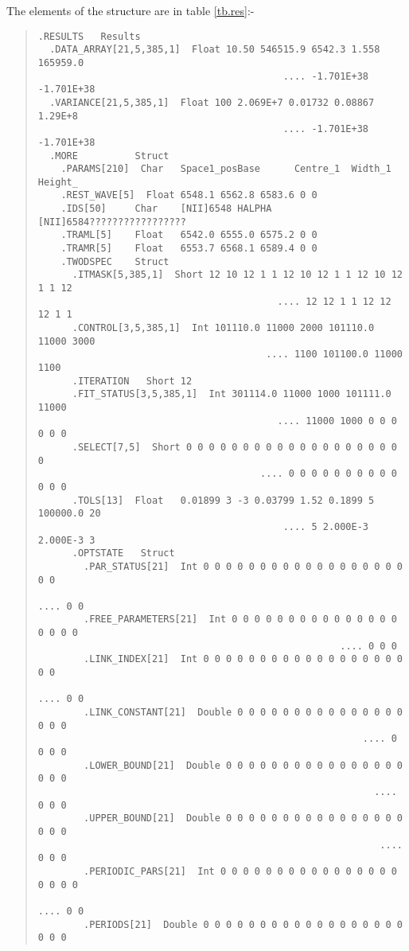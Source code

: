  The elements of the structure are in table \ref{tb.res}:-
\begin{table}
\begin{quote}\begin{verbatim}
.RESULTS   Results
  .DATA_ARRAY[21,5,385,1]  Float 10.50 546515.9 6542.3 1.558 165959.0
                                           .... -1.701E+38 -1.701E+38
  .VARIANCE[21,5,385,1]  Float 100 2.069E+7 0.01732 0.08867 1.29E+8
                                           .... -1.701E+38 -1.701E+38
  .MORE          Struct
    .PARAMS[210]  Char   Space1_posBase      Centre_1  Width_1   Height_
    .REST_WAVE[5]  Float 6548.1 6562.8 6583.6 0 0
    .IDS[50]     Char    [NII]6548 HALPHA    [NII]6584?????????????????
    .TRAML[5]    Float   6542.0 6555.0 6575.2 0 0
    .TRAMR[5]    Float   6553.7 6568.1 6589.4 0 0
    .TWODSPEC    Struct
      .ITMASK[5,385,1]  Short 12 10 12 1 1 12 10 12 1 1 12 10 12 1 1 12
                                          .... 12 12 1 1 12 12 12 1 1
      .CONTROL[3,5,385,1]  Int 101110.0 11000 2000 101110.0 11000 3000
                                        .... 1100 101100.0 11000 1100
      .ITERATION   Short 12
      .FIT_STATUS[3,5,385,1]  Int 301114.0 11000 1000 101111.0 11000
                                          .... 11000 1000 0 0 0 0 0 0
      .SELECT[7,5]  Short 0 0 0 0 0 0 0 0 0 0 0 0 0 0 0 0 0 0 0 0
                                       .... 0 0 0 0 0 0 0 0 0 0 0 0 0
      .TOLS[13]  Float   0.01899 3 -3 0.03799 1.52 0.1899 5 100000.0 20
                                           .... 5 2.000E-3 2.000E-3 3
      .OPTSTATE   Struct
        .PAR_STATUS[21]  Int 0 0 0 0 0 0 0 0 0 0 0 0 0 0 0 0 0 0 0 0
                                                             .... 0 0
        .FREE_PARAMETERS[21]  Int 0 0 0 0 0 0 0 0 0 0 0 0 0 0 0 0 0 0 0
                                                     .... 0 0 0
        .LINK_INDEX[21]  Int 0 0 0 0 0 0 0 0 0 0 0 0 0 0 0 0 0 0 0 0
                                                             .... 0 0
        .LINK_CONSTANT[21]  Double 0 0 0 0 0 0 0 0 0 0 0 0 0 0 0 0 0 0
                                                         .... 0 0 0 0
        .LOWER_BOUND[21]  Double 0 0 0 0 0 0 0 0 0 0 0 0 0 0 0 0 0 0 0
                                                           .... 0 0 0
        .UPPER_BOUND[21]  Double 0 0 0 0 0 0 0 0 0 0 0 0 0 0 0 0 0 0 0
                                                            .... 0 0 0
        .PERIODIC_PARS[21]  Int 0 0 0 0 0 0 0 0 0 0 0 0 0 0 0 0 0 0 0 0
                                                             .... 0 0
        .PERIODS[21]  Double 0 0 0 0 0 0 0 0 0 0 0 0 0 0 0 0 0 0 0 0 0

\end{verbatim}
\end{quote}
\end{table}
